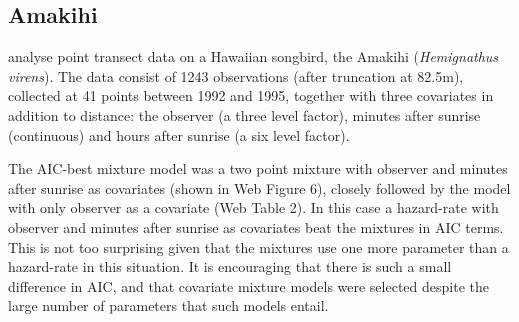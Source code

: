 \documentclass[useAMS,referee,usenatbib]{biom}
\begin{document}
\subsection{Amakihi}
\label{s:amakihi}

\cite{Marques:2007vm} analyse point transect data on a Hawaiian songbird, the Amakihi (\textit{Hemignathus virens}). The data consist of 1243 observations (after truncation at 82.5m), collected at 41 points between 1992 and 1995, together with three covariates in addition to distance: the observer (a three level factor), minutes after sunrise (continuous) and hours after sunrise (a six level factor).

The AIC-best mixture model was a two point mixture with observer and minutes after sunrise as covariates (shown in Web Figure 6), closely followed by the model with only observer as a covariate (Web Table 2). In this case a hazard-rate with observer and minutes after sunrise as covariates beat the mixtures in AIC terms. This is not too surprising given that the mixtures use one more parameter than a hazard-rate in this situation. It is encouraging that there is such a small difference in AIC, and that covariate mixture models were selected despite the large number of parameters that such models entail.
\end{document}
